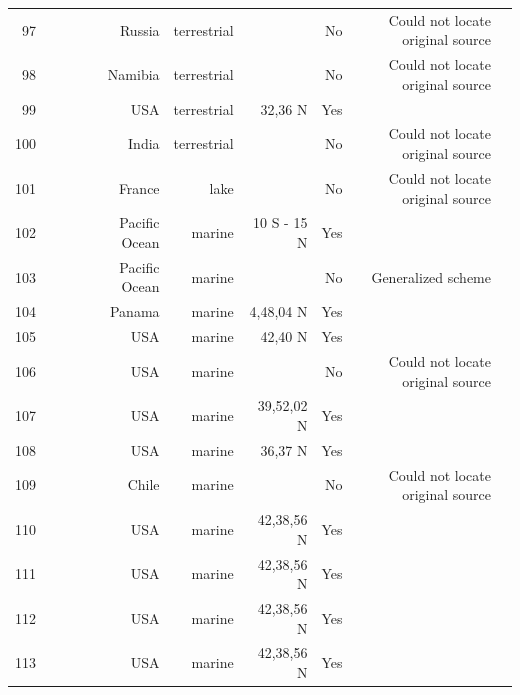 \documentclass[12pt]{article}
\begin{document}
\begin{landscape}
\begin{table}[h!]
\begin{tabular}{rrrrrrrrr}
      97    & ~\citet{GlobalWeb} & ~\citet{Cohen1990} & Russia & terrestrial &       & No    & Could not locate original source &  \\
      98    & ~\citet{GlobalWeb} & ~\citet{Holm1980} & Namibia & terrestrial &       & No    & Could not locate original source &  \\
      99    & ~\citet{GlobalWeb} & ~\citet{Howes1954} & USA   & terrestrial & 32,36 N & Yes   &       &  \\
      100   & ~\citet{GlobalWeb} & ~\citet{Cohen1990} & India & terrestrial &       & No    & Could not locate original source &  \\
      101   & ~\citet{GlobalWeb} & ~\citet{Cohen1990} & France & lake  &       & No    & Could not locate original source &  \\
      102   & ~\citet{GlobalWeb} & ~\citet{Shushkina1973} & Pacific Ocean & marine & 10 S - 15 N & Yes   &       &  \\
      103   & ~\citet{GlobalWeb} & ~\citet{Petipa1979} & Pacific Ocean & marine &       & No    & Generalized scheme &  \\
      104   & ~\citet{GlobalWeb} & ~\citet{Menge1976} & Panama & marine & 4,48,04 N & Yes   &       &  \\
      105   & ~\citet{GlobalWeb} & ~\citet{Edwards1982} & USA & marine & 42,40 N & Yes   &       &  \\
      106   & ~\citet{GlobalWeb} & ~\citet{Glynn1965} & USA & marine &       & No    & Could not locate original source &  \\
      107   & ~\citet{GlobalWeb} & ~\citet{Peterson1979} & USA & marine & 39,52,02 N & Yes   &       &  \\
      108   & ~\citet{GlobalWeb} & ~\citet{Hewatt1937} & USA & marine & 36,37 N & Yes   &       &  \\
      109   & ~\citet{GlobalWeb} & ~\citet{Castilla1981} & Chile} & marine &       & No    & Could not locate original source &  \\
      110   & ~\citet{GlobalWeb} & ~\citet{Dexter1947} & USA & marine & 42,38,56 N & Yes   &       &  \\
      111   & ~\citet{GlobalWeb} & ~\citet{Dexter1947} & USA & marine & 42,38,56 N & Yes   &       &  \\
      112   & ~\citet{GlobalWeb} & ~\citet{Dexter1947} & USA & marine & 42,38,56 N & Yes   &       &  \\
      113   & ~\citet{GlobalWeb} & ~\citet{Dexter1947} & USA & marine & 42,38,56 N & Yes   &       &  \\

\end{tabular}
\end{table}
\end{landscape}
\end{document}
